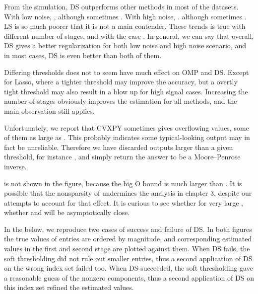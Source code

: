 \stopsubsection

\startsubsection [title={Discussion}]

From the simulation, DS outperforms other methods in most of the datasets.
With low noise, ,
although sometimes .
With high noise, .
although sometimes .
LS is so much poorer that it is not a main contender.
These trends is true with different number of stages, and with the case .
In general, we can say that overall, DS gives a better regularization for both low noise and high noise scenario, and in most cases, DS is even better than both of them.

Differing thresholds does not to seem have much effect on OMP and DS.
Except for Lasso, where a tighter threshold may improve the accuracy, but a overtly tight threshold may also result in a blow up for high signal cases.
Increasing the number of stages obviously improves the estimation for all methods, and the main observation still applies.

Unfortunately, we report that CVXPY sometimes gives overflowing values, some of them as large as .
This probably indicates some typical-looking output may in fact be unreliable.
Therefore we have discarded outputs larger than a given threshold, for instance , and simply return the answer to be a Moore–Penrose inverse.

\m {\chi} is not shown in the figure, because the big O bound is much larger than \m {\T {\chi}}.
It is possible that the nonsparsity of  undermines the analysis in chapter 3, despite our attempts to account for that effect.
It is curious to see whether for very large , whether \m {\T {\chi}} and \m {\chi} will be asymptotically close.

In the below, we reproduce two cases of success and failure of DS.
In both figures the true values of  entries are ordered by magnitude, and corresponding estimated values in the first and second stage are plotted against them.
When DS fails, the soft thresholding did not rule out smaller entries, thus a second application of DS on the wrong index set failed too.
When DS succeeded, the soft thresholding gave a reasonable guess of the nonzero components, thus a second application of DS on this index set refined the estimated values.


